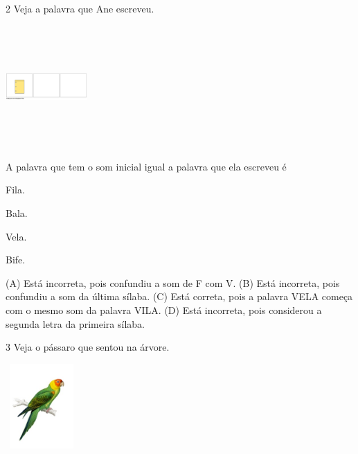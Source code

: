 \num{2} Veja a palavra que Ane escreveu.

\includegraphics[width=1.22986in,height=1.82986in]{media/image164.png}


A palavra que tem o som inicial igual a palavra que ela escreveu é

\begin{minipage}{.5\textwidth}
\begin{escolha}
\item Fila.

\item Bala.

\item Vela.

\item Bife.
\end{escolha}
\end{minipage}

(A) Está incorreta, pois confundiu a som de F com V.
(B) Está incorreta, pois confundiu a som da última sílaba.
(C) Está correta, pois a palavra VELA começa com o mesmo som da palavra VILA.
(D) Está incorreta, pois considerou a segunda letra da primeira sílaba.

\num{3} Veja o pássaro que sentou na árvore.

\includegraphics[width=1.08542in,height=1.27222in]{media/image165.jpeg}


